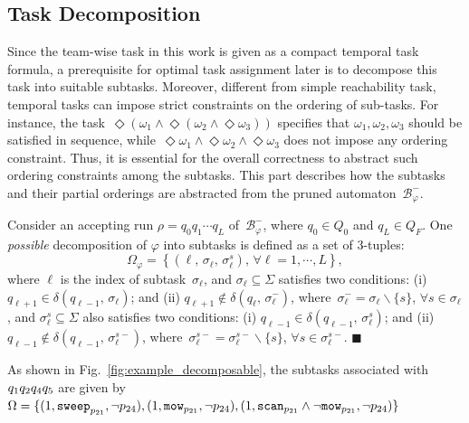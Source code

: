 \subsection{Task Decomposition}\label{subsubsec:task-decompose}
Since the team-wise task in this work is given as a compact temporal task formula,
a prerequisite for optimal task assignment later is to decompose this task into suitable subtasks.
Moreover, different from simple reachability task,
temporal tasks can impose strict constraints on the ordering of sub-tasks.
For instance, the task~$\Diamond (\omega_1 \land \Diamond (\omega_2 \land \Diamond\omega_3)) $
specifies that $\omega_1,\omega_2,\omega_3$ should be satisfied in sequence,
while~$\Diamond\omega_1\land\Diamond\omega_2\land\Diamond\omega_3$ does not impose any ordering constraint.
Thus, it is essential for the overall correctness to abstract such ordering constraints among the subtasks.
This part describes how the subtasks and their partial orderings are abstracted from the pruned automaton~$\mathcal{B}_{\varphi}^{-}$.

\begin{definition} \label{def:subtasks}
Consider an accepting run $\rho=q_0q_1\cdots q_L$ of~$\mathcal{B}_{\varphi}^{-}$,
where $q_0\in Q_0$ and $q_L\in Q_F$.
One \emph{possible} decomposition of $\varphi$ into subtasks is defined
as a set of 3-tuples:
\begin{equation}\label{eq:subtask}
\Omega_{\varphi} = \left\{(\ell,\, \sigma_\ell,\, \sigma^{s}_\ell),\, \forall \ell=1,\cdots,L\right\},
\end{equation}
where $\ell$ is the index of subtask~$\sigma_\ell$,
and $\sigma_\ell\subseteq \Sigma$ satisfies two conditions:
(i) $q_{\ell+1} \in \delta(q_{\ell-1},\,\sigma_\ell)$;
and (ii) $q_{\ell+1} \notin \delta(q_\ell,\,\sigma^-_\ell)$, where~$\sigma^-_\ell =  \sigma_\ell \backslash \{s\}$, $\forall s\in \sigma_\ell$,
and $\sigma^{s}_\ell\subseteq \Sigma$ also satisfies two conditions:
(i) $q_{\ell-1} \in \delta(q_{\ell-1},\,\sigma^{s}_\ell)$;
and (ii) $q_{\ell-1} \notin \delta(q_{\ell-1},\,\sigma^{s-}_\ell)$, where~$\sigma^{s-}_\ell =  \sigma^{s-}_\ell \backslash \{s\}$, $\forall s\in \sigma^{s-}_\ell$.
\hfill $\blacksquare$
\end{definition}

\begin{example}
	\label{example:subtask}
        {As shown in Fig.~\ref{fig:example_decomposable},
          the subtasks associated with~$q_1q_2\\q_4q_5$ are given
          by~$\Omega=\{(1,\texttt{sweep}_{p_{21}} ,\lnot p_{24}),
(1,\texttt{mow}_{p_{21}} ,\lnot p_{24}),\\
(1,\texttt{scan}_{p_{21}}\land\lnot \texttt{mow}_{p_{21}} ,\lnot p_{24})\}$}
\end{example}

